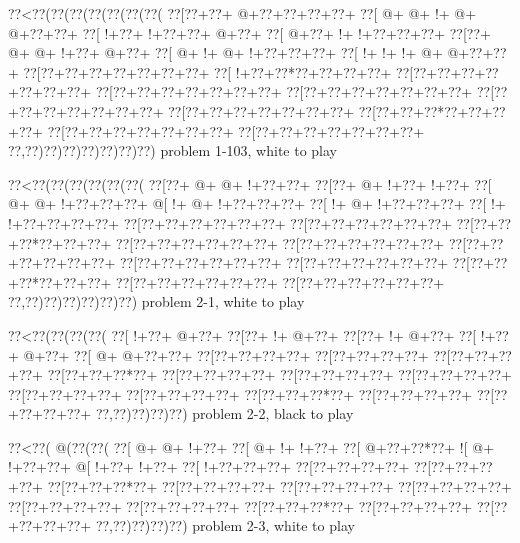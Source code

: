 \vbox{\vbox{\goo
\0??<\0??(\0??(\0??(\0??(\0??(\0??(\0??(
\0??[\0??+\0??+\- @+\0??+\0??+\0??+\0??+
\0??[\- @+\- @+\- !+\- @+\- @+\0??+\0??+
\0??[\- !+\0??+\- !+\0??+\0??+\- @+\0??+
\0??[\- @+\0??+\- !+\- !+\0??+\0??+\0??+
\0??[\0??+\- @+\- @+\- !+\0??+\- @+\0??+
\0??[\- @+\- !+\- @+\- !+\0??+\0??+\0??+
\0??[\- !+\- !+\- !+\- @+\- @+\0??+\0??+
\0??[\0??+\0??+\0??+\0??+\0??+\0??+\0??+
\0??[\- !+\0??+\0??*\0??+\0??+\0??+\0??+
\0??[\0??+\0??+\0??+\0??+\0??+\0??+\0??+
\0??[\0??+\0??+\0??+\0??+\0??+\0??+\0??+
\0??[\0??+\0??+\0??+\0??+\0??+\0??+\0??+
\0??[\0??+\0??+\0??+\0??+\0??+\0??+\0??+
\0??[\0??+\0??+\0??+\0??+\0??+\0??+\0??+
\0??[\0??+\0??+\0??*\0??+\0??+\0??+\0??+
\0??[\0??+\0??+\0??+\0??+\0??+\0??+\0??+
\0??[\0??+\0??+\0??+\0??+\0??+\0??+\0??+
\0??,\0??)\0??)\0??)\0??)\0??)\0??)\0??)
}
\hfil problem 1-103, white to play\hfil\break
}

\vbox{\vbox{\goo
\0??<\0??(\0??(\0??(\0??(\0??(\0??(
\0??[\0??+\- @+\- @+\- !+\0??+\0??+
\0??[\0??+\- @+\- !+\0??+\- !+\0??+
\0??[\- @+\- @+\- !+\0??+\0??+\0??+
\- @[\- !+\- @+\- !+\0??+\0??+\0??+
\0??[\- !+\- @+\- !+\0??+\0??+\0??+
\0??[\- !+\- !+\0??+\0??+\0??+\0??+
\0??[\0??+\0??+\0??+\0??+\0??+\0??+
\0??[\0??+\0??+\0??+\0??+\0??+\0??+
\0??[\0??+\0??+\0??*\0??+\0??+\0??+
\0??[\0??+\0??+\0??+\0??+\0??+\0??+
\0??[\0??+\0??+\0??+\0??+\0??+\0??+
\0??[\0??+\0??+\0??+\0??+\0??+\0??+
\0??[\0??+\0??+\0??+\0??+\0??+\0??+
\0??[\0??+\0??+\0??+\0??+\0??+\0??+
\0??[\0??+\0??+\0??*\0??+\0??+\0??+
\0??[\0??+\0??+\0??+\0??+\0??+\0??+
\0??[\0??+\0??+\0??+\0??+\0??+\0??+
\0??,\0??)\0??)\0??)\0??)\0??)\0??)
}
\hfil problem 2-1, white to play\hfil\break
}

\vbox{\vbox{\goo
\0??<\0??(\0??(\0??(\0??(
\0??[\- !+\0??+\- @+\0??+
\0??[\0??+\- !+\- @+\0??+
\0??[\0??+\- !+\- @+\0??+
\0??[\- !+\0??+\- @+\0??+
\0??[\- @+\- @+\0??+\0??+
\0??[\0??+\0??+\0??+\0??+
\0??[\0??+\0??+\0??+\0??+
\0??[\0??+\0??+\0??+\0??+
\0??[\0??+\0??+\0??*\0??+
\0??[\0??+\0??+\0??+\0??+
\0??[\0??+\0??+\0??+\0??+
\0??[\0??+\0??+\0??+\0??+
\0??[\0??+\0??+\0??+\0??+
\0??[\0??+\0??+\0??+\0??+
\0??[\0??+\0??+\0??*\0??+
\0??[\0??+\0??+\0??+\0??+
\0??[\0??+\0??+\0??+\0??+
\0??,\0??)\0??)\0??)\0??)
}
\hfil problem 2-2, black to play\hfil\break
}

\vbox{\vbox{\goo
\0??<\0??(\- @(\0??(\0??(
\0??[\- @+\- @+\- !+\0??+
\0??[\- @+\- !+\- !+\0??+
\0??[\- @+\0??+\0??*\0??+
\- ![\- @+\- !+\0??+\0??+
\- @[\- !+\0??+\- !+\0??+
\0??[\- !+\0??+\0??+\0??+
\0??[\0??+\0??+\0??+\0??+
\0??[\0??+\0??+\0??+\0??+
\0??[\0??+\0??+\0??*\0??+
\0??[\0??+\0??+\0??+\0??+
\0??[\0??+\0??+\0??+\0??+
\0??[\0??+\0??+\0??+\0??+
\0??[\0??+\0??+\0??+\0??+
\0??[\0??+\0??+\0??+\0??+
\0??[\0??+\0??+\0??*\0??+
\0??[\0??+\0??+\0??+\0??+
\0??[\0??+\0??+\0??+\0??+
\0??,\0??)\0??)\0??)\0??)
}
\hfil problem 2-3, white to play\hfil\break
}

